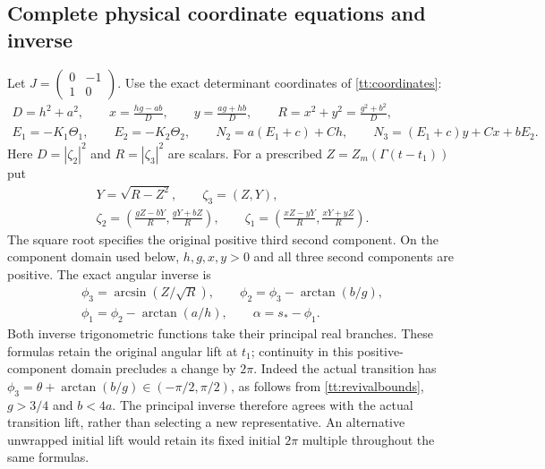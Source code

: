 \subsection{Complete physical coordinate equations and inverse}

Let $J=\left(\begin{smallmatrix}0&-1\\1&0\end{smallmatrix}\right)$.
Use the exact determinant coordinates of \eqref{tt:coordinates}:
\begin{equation}\label{tr:coordinates}
 \begin{gathered}
 D=h^2+a^2,\qquad
 x=\frac{hg-ab}{D},\qquad y=\frac{ag+hb}{D},\qquad
 R=x^2+y^2=\frac{g^2+b^2}{D},\\
 E_1=-K_1\Theta_1,\qquad E_2=-K_2\Theta_2,\qquad
 N_2=a(E_1+c)+Ch,\qquad
 N_3=(E_1+c)y+Cx+bE_2.
 \end{gathered}
\end{equation}
Here $D=|\zeta_2|^2$ and $R=|\zeta_3|^2$ are scalars.
For a prescribed $Z=Z_m(\Gamma(t-t_1))$ put
\begin{equation}\label{tr:inverse}
 \begin{gathered}
 Y=\sqrt{R-Z^2},\qquad \zeta_3=(Z,Y),\\
 \zeta_2=\left(\frac{gZ-bY}{R},\frac{gY+bZ}{R}\right),
 \qquad
 \zeta_1=\left(\frac{xZ-yY}{R},\frac{xY+yZ}{R}\right).
 \end{gathered}
\end{equation}
The square root specifies the original positive third second component.
On the component domain used below, $h,g,x,y>0$ and all three
second components are positive. The exact angular inverse is
\begin{equation}\label{tr:angles}
 \begin{gathered}
 \phi_3=\arcsin(Z/\sqrt R),\qquad
 \phi_2=\phi_3-\arctan(b/g),\\
 \phi_1=\phi_2-\arctan(a/h),\qquad
 \alpha=s_*-\phi_1.
 \end{gathered}
\end{equation}
Both inverse trigonometric functions take their principal real branches.
These formulas retain the original angular lift at $t_1$; continuity
in this positive-component domain precludes a change by $2\pi$.
Indeed the actual transition has
$\phi_3=\theta+\arctan(b/g)\in(-\pi/2,\pi/2)$, as follows
from \eqref{tt:revivalbounds}, $g>3/4$ and $b<4a$.
The principal inverse therefore agrees with the actual transition
lift, rather than selecting a new representative. An alternative
unwrapped initial lift would retain its fixed initial $2\pi$ multiple
throughout the same formulas.

